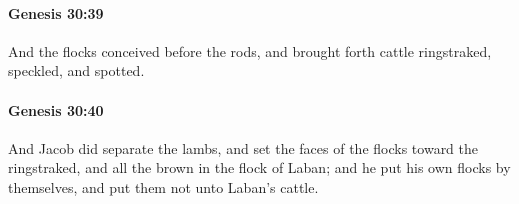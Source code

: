 		\paragraph{Genesis 30:39} %
			\label{GENESIS-30-39}

			And the flocks conceived before the rods, and brought forth cattle ringstraked, speckled, and spotted.


		\paragraph{Genesis 30:40} %
			\label{GENESIS-30-40}

			And Jacob did separate the lambs, and set the faces of the flocks toward the ringstraked, and all the brown in the flock of Laban; and he put his own flocks by themselves, and put them not unto Laban's cattle.


